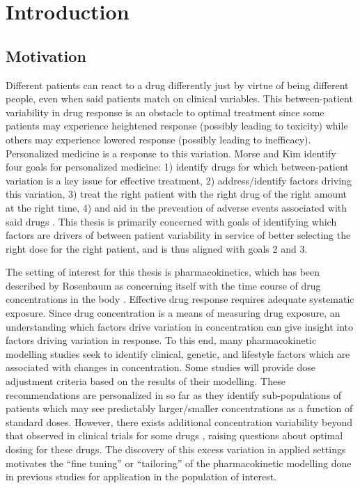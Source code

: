 \chapter{Introduction}

\section{Motivation}

Different patients can react to a drug differently just by virtue of being different people, even when said patients match on clinical variables.  This between-patient variability in drug response is an obstacle to optimal treatment since some patients may experience heightened response (possibly leading to toxicity) while others may experience lowered response (possibly leading to inefficacy).  Personalized medicine is a response to this variation.  Morse and Kim identify four goals for personalized medicine: 1) identify drugs for which between-patient variation is a key issue for effective treatment,  2) address/identify factors driving this variation, 3) treat the right patient with the right drug  of the right amount at the right time, 4) and aid in the prevention of adverse events associated with said drugs \cite{morse2015personalized}.  This thesis is primarily concerned with goals of identifying which factors are drivers of between patient variability in service of better selecting the right dose for the right patient, and is thus aligned with goals 2 and 3.

The setting of interest for this thesis is pharmacokinetics, which has been described by Rosenbaum as concerning itself with the time course of drug concentrations in the body \cite{ rosenbaum2016basic}.
Effective drug response requires adequate systematic exposure.  Since drug concentration is a means of measuring drug exposure,  an understanding which factors drive variation in concentration can give insight into factors driving variation in response.  To this end, many pharmacokinetic modelling studies seek to identify clinical, genetic, and lifestyle factors which are associated with changes in concentration. Some studies will provide dose adjustment criteria based on the results of their modelling. These recommendations are personalized in so far as they identify sub-populations of patients which may see predictably larger/smaller concentrations as a function of standard doses. However, there exists additional concentration variability beyond that observed in clinical trials for some drugs \cite{sukumar2019apixaban}, raising questions about optimal dosing for these drugs.  The discovery of this excess variation in applied settings motivates the ``fine tuning'' or ``tailoring'' of the pharmacokinetic modelling done in previous studies for application in the population of interest.

